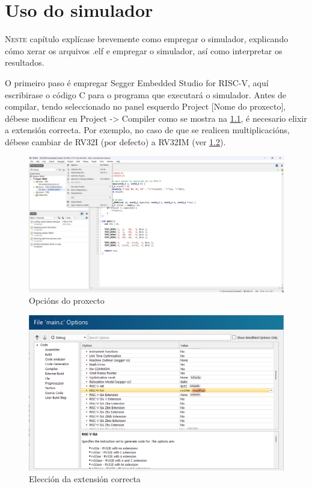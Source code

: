 \chapter{Uso do simulador}
\label{chap:uso_simulador}

\lettrine{N}{este} capítulo explícase brevemente como empregar o simulador, explicando cómo xerar os arquivos .elf e empregar o simulador, así como interpretar os resultados. 

O primeiro paso é empregar Segger Embedded Studio for RISC-V, aquí escribirase o código C para o programa que executará o simulador. Antes de compilar, tendo seleccionado no panel esquerdo Project [Nome do proxecto], débese modificar en Project -> Compiler como se mostra na \ref{fig:cap1}, é necesario elixir a extensión correcta. Por exemplo, no caso de que se realicen multiplicacións, débese cambiar de RV32I (por defecto) a RV32IM (ver \ref{fig:cap2}).

\begin{figure}[hp!]
  \centering
  \includegraphics[width=\textwidth]{imaxes/Cap_1.jpg}
  \caption{Opcións do proxecto}
  \label{fig:cap1}
\end{figure}

\begin{figure}[hp!]
  \centering
  \includegraphics[width=\textwidth]{imaxes/Cap_2.png}
  \caption{Elección da extensión correcta}
  \label{fig:cap2}
\end{figure}

